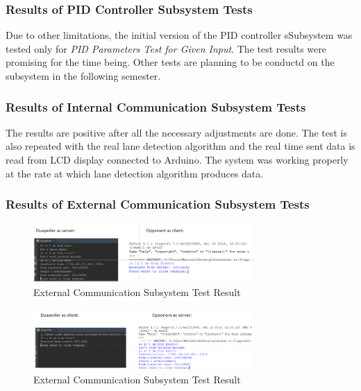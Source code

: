 \documentclass[a4paper,12pt]{article}
\begin{document}
	
	
	
	
		
	
	
		
		
	\subsubsection*{Results of PID Controller Subsystem Tests}
	
  Due to other limitations, the initial version of the PID controller sSubsystem was tested only for \textit{PID Parameters Test for Given Input}. The test results were promising for the time being. Other tests are planning to be conductd on the subsystem in the following semester.
	
	
	
	
	
	
	
	\subsubsection*{Results of Internal Communication Subsystem Tests}
	The results are positive after all the necessary adjustments are done. The test is also repeated with the real lane detection algorithm and the real time sent data is read from LCD display connected to Arduino. The system was working properly at the rate at which lane detection algorithm produces data.
	

	
	
	
	
	\subsubsection*{Results of External Communication Subsystem Tests}
	
	
	\begin{figure}[h]
		\includegraphics[width=0.75\textwidth,center]{images/hsake1}
		\caption{External Communication Subsystem Test Result \label{fig:hsake_test1} }
	\end{figure}
	
	
	\begin{figure}[h]
		\includegraphics[width=0.75\textwidth,center]{images/hsake2}
		\caption{External Communication Subsystem Test Result \label{fig:hsake_test2} }
	\end{figure}
	
\end{document}
